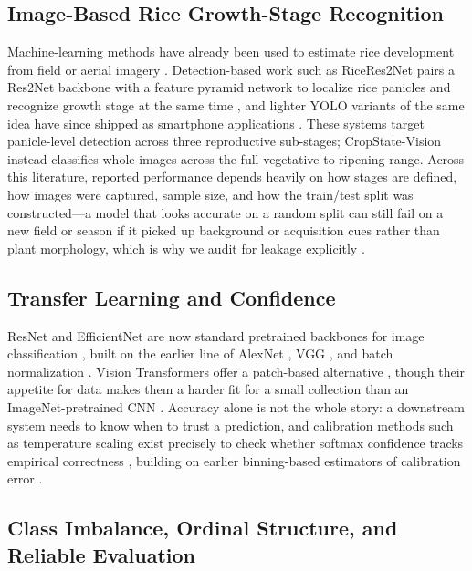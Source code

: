 \documentclass{llncs}
\begin{document}
\subsection{Image-Based Rice Growth-Stage Recognition}

Machine-learning methods have already been used to estimate rice development from field or aerial imagery \cite{tan2022machine}. Detection-based work such as RiceRes2Net pairs a Res2Net backbone with a feature pyramid network to localize rice panicles and recognize growth stage at the same time \cite{tan2023ricepanicle}, and lighter YOLO variants of the same idea have since shipped as smartphone applications \cite{zheng2025android}. These systems target panicle-level detection across three reproductive sub-stages; CropState-Vision instead classifies whole images across the full vegetative-to-ripening range. Across this literature, reported performance depends heavily on how stages are defined, how images were captured, sample size, and how the train/test split was constructed---a model that looks accurate on a random split can still fail on a new field or season if it picked up background or acquisition cues rather than plant morphology, which is why we audit for leakage explicitly \cite{kapoor2023leakage}.

\subsection{Transfer Learning and Confidence}

ResNet and EfficientNet are now standard pretrained backbones for image classification \cite{he2016deep,tan2019efficientnet}, built on the earlier line of AlexNet \cite{krizhevsky2012alexnet}, VGG \cite{simonyan2015vgg}, and batch normalization \cite{ioffe2015batchnorm}. Vision Transformers offer a patch-based alternative \cite{dosovitskiy2021vit}, though their appetite for data makes them a harder fit for a small collection than an ImageNet-pretrained CNN \cite{deng2009imagenet,pan2010survey}. Accuracy alone is not the whole story: a downstream system needs to know when to trust a prediction, and calibration methods such as temperature scaling exist precisely to check whether softmax confidence tracks empirical correctness \cite{guo2017calibration}, building on earlier binning-based estimators of calibration error \cite{naeini2015calibration}.

\subsection{Class Imbalance, Ordinal Structure, and Reliable Evaluation}
\end{document}
